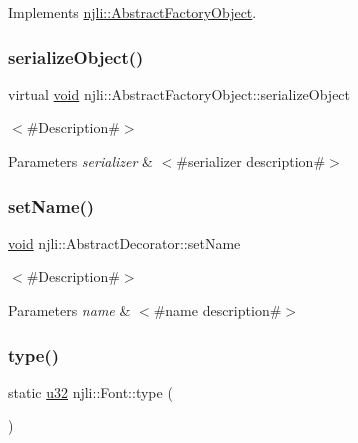 Implements \mbox{\hyperlink{classnjli_1_1_abstract_factory_object_aad2fbe86fb3bdecf02918a96b9c57976}{njli\+::\+Abstract\+Factory\+Object}}.

\mbox{\label{classnjli_1_1_font_a4fc4bcd9d1930911474210c047372fc0}} 
\subsubsection{\texorpdfstring{serialize\+Object()}{serializeObject()}}
{\footnotesize\ttfamily virtual \mbox{\hyperlink{_thread_8h_af1e856da2e658414cb2456cb6f7ebc66}{void}} njli\+::\+Abstract\+Factory\+Object\+::serialize\+Object}

$<$\#\+Description\#$>$


\begin{DoxyParams}{Parameters}
{\em serializer} & $<$\#serializer description\#$>$ \\
\hline
\end{DoxyParams}
\mbox{\label{classnjli_1_1_font_a087eb5f8d9f51cc476f12f1d10a3cb95}} 
\subsubsection{\texorpdfstring{set\+Name()}{setName()}}
{\footnotesize\ttfamily \mbox{\hyperlink{_thread_8h_af1e856da2e658414cb2456cb6f7ebc66}{void}} njli\+::\+Abstract\+Decorator\+::set\+Name}

$<$\#\+Description\#$>$


\begin{DoxyParams}{Parameters}
{\em name} & $<$\#name description\#$>$ \\
\hline
\end{DoxyParams}
\mbox{\label{classnjli_1_1_font_a0e79b95a46dff1253ab6f4e6958cad3e}} 
\subsubsection{\texorpdfstring{type()}{type()}}
{\footnotesize\ttfamily static \mbox{\hyperlink{_util_8h_a10e94b422ef0c20dcdec20d31a1f5049}{u32}} njli\+::\+Font\+::type (\begin{DoxyParamCaption}{ }\end{DoxyParamCaption})\hspace{0.3cm}{\ttfamily [static]}}


